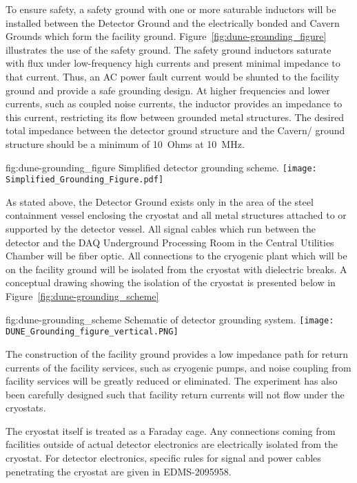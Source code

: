 To ensure safety, a safety ground with one or more saturable inductors
will be installed between the Detector Ground and the electrically
bonded  and Cavern Grounds which form the facility ground.
Figure~\ref{fig:dune-grounding_figure} illustrates the use of the
safety ground. The safety ground inductors saturate with flux under
low-frequency high currents and present minimal impedance to that
current.  Thus, an AC power fault current would be shunted to the
facility ground and provide a safe grounding design. At higher
frequencies and lower currents, such as coupled noise currents, the
inductor provides an impedance to this current, restricting its flow
between grounded metal structures. The desired total impedance between
the detector ground structure and the Cavern/ ground
structure should be a minimum of \SI{10}{Ohms} at \SI{10}{MHz}.

\begin{dunefigure}{fig:dune-grounding_figure}
  {Simplified detector grounding scheme.}
  \texttt{[image: Simplified\_Grounding\_Figure.pdf]}
\end{dunefigure}

As stated above, the Detector Ground exists only in the area of the
steel containment vessel enclosing the cryostat and all metal
structures attached to or supported by the detector vessel.  All
signal cables which run between the detector and the DAQ Underground
Processing Room in the Central Utilities Chamber will be fiber optic.
All connections to the cryogenic plant which will be on the facility
ground will be isolated from the cryostat with dielectric breaks.  A
conceptual drawing showing the isolation of the cryostat is presented
below in Figure~\ref{fig:dune-grounding_scheme}

\begin{dunefigure}{fig:dune-grounding_scheme}
  {Schematic of detector grounding system.}
  \texttt{[image: DUNE\_Grounding\_figure\_vertical.PNG]}
\end{dunefigure}

The construction of the facility ground provides a low impedance path
for return currents of the facility services, such as cryogenic pumps,
and noise coupling from facility services will be greatly reduced or
eliminated.  The experiment has also been carefully designed such that
facility return currents will not flow under the cryostats.

The cryostat itself is treated as a Faraday cage.  Any connections
coming from facilities outside of actual detector electronics are
electrically isolated from the cryostat.  For detector electronics,
specific rules for signal and power cables penetrating the cryostat
are given in EDMS-2095958\cite{bib:cernedms2095958}.





